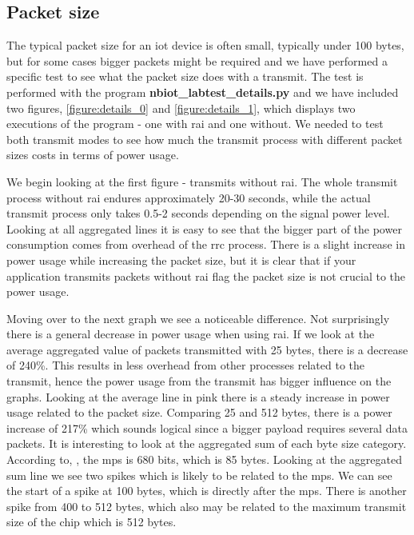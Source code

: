 \documentclass[USenglish]{ifimaster}  %
\begin{document}
\subsection{Packet size} \label{ssection:packetsize}
The typical packet size for an \acrshort{iot} device is often small, typically under 100 bytes, but for some cases bigger packets might be required and we have performed a specific test to see what the packet size does with a transmit. The test is performed with the program \textbf{nbiot\_labtest\_details.py} and we have included two figures, \vref{figure:details_0} and \vref{figure:details_1}, which displays two executions of the program - one with \acrshort{rai} and one without. We needed to test both transmit modes to see how much the transmit process with different packet sizes costs in terms of power usage.

We begin looking at the first figure - transmits without \acrshort{rai}. The whole transmit process without \acrshort{rai} endures approximately 20-30 seconds, while the actual transmit process only takes 0.5-2 seconds depending on the signal power level. Looking at all aggregated lines it is easy to see that the bigger part of the power consumption comes from overhead of the \acrshort{rrc} process. There is a slight increase in power usage while increasing the packet size, but it is clear that if your application transmits packets without \acrshort{rai} flag the packet size is not crucial to the power usage.

Moving over to the next graph we see a noticeable difference. Not surprisingly there is a general decrease in power usage when using \acrshort{rai}. If we look at the average aggregated value of packets transmitted with 25 bytes, there is a decrease of 240\%. This results in less overhead from other processes related to the transmit, hence the power usage from the transmit has bigger influence on the graphs. Looking at the average line in pink there is a steady increase in power usage related to the packet size. Comparing 25 and 512 bytes, there is a power increase of 217\% which sounds logical since a bigger payload requires several data packets. It is interesting to look at the aggregated sum of each byte size category. According to, \cite{online:rohde}, the \acrfull{mps} is 680 bits, which is 85 bytes. Looking at the aggregated sum line we see two spikes which is likely to be related to the \acrshort{mps}. We can see the start of a spike at 100 bytes, which is directly after the \acrshort{mps}. There is another spike from 400 to 512 bytes, which also may be related to the maximum transmit size of the chip which is 512 bytes.
\end{document}
